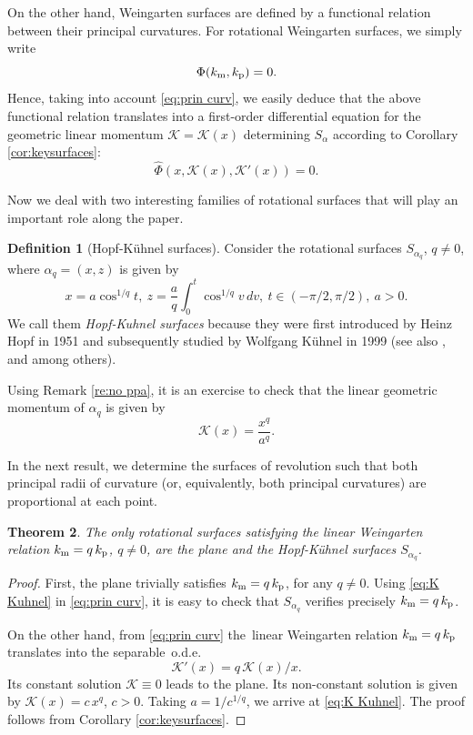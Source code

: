 \documentclass[leqno,11pt]{amsart}
\newtheorem{theorem}{Theorem}[section]
\theoremstyle{definition}
\newtheorem{definition}[theorem]{Definition}
\numberwithin{equation}{section}
\begin{document}
On the other hand, Weingarten surfaces are defined by a functional relation between their principal curvatures.
For rotational Weingarten surfaces,
we simply write $$\Phi(k_{\text m}, k_{\text p})=0.$$
Hence, taking into account \eqref{eq:prin curv}, we easily deduce that the above functional relation translates into a first-order differential equation for the geometric linear momentum $\mathcal K=\mathcal K (x)$ determining $S_\alpha$ according to Corollary \ref{cor:keysurfaces}: 
$$ \hat \Phi (x,\mathcal K  (x),\mathcal K ' (x))=0. $$

Now we deal with two interesting families of rotational surfaces that will play an important role along the paper.
\begin{definition}[Hopf-Kühnel surfaces]\label{def:Kuhnel}
	 Consider the rotational surfaces $S_{\alpha_q}$, $q\neq 0$, where $\alpha_q=(x,z)$ is given by
	 $$
	 x= a \cos ^{1/q} t, \ z= \frac{a}{q}\int_0^t \cos ^{1/q} v \, dv, \ t\in (-\pi/2,\pi/2), \ a>0. 
	 $$
	 We call them {\em Hopf-Kuhnel surfaces} because they were first introduced by Heinz Hopf  \cite{H51} in 1951 and subsequently studied by Wolfgang Kühnel \cite{K15} in 1999 (see also \cite{F93}, \cite{KS05} and \cite{LP20} among others).
\end{definition}
Using Remark \ref{re:no ppa}, it is an exercise to check that the linear geometric momentum of $\alpha_q$ is given by
\begin{equation}\label{eq:K Kuhnel}
	\mathcal K (x)= \frac{x^q}{a^q}.
\end{equation}

In the next result, we determine the surfaces of revolution such that both principal radii of curvature (or, equivalently, both principal curvatures) are proportional at each point.
	
	\begin{theorem}\label{Th:Kuhnel}
		The only rotational surfaces satisfying the linear Weingarten relation $k_{\text m} = q\,  k_{\text p}$, $q\neq 0$, are the plane and the Hopf-Kühnel surfaces $S_{\alpha_q}$.
	\end{theorem}
	
	\begin{proof}
		First, the plane trivially satisfies $k_{\text m} = q\,  k_{\text p}$, for any $q\neq 0$. Using \eqref{eq:K Kuhnel} in \eqref{eq:prin curv}, it is easy to check that $S_{\alpha_q}$ verifies precisely $k_{\text m} = q\,  k_{\text p}$.
		
		On the other hand, from \eqref{eq:prin curv} 
		the~linear Weingarten relation $k_{\text m}=q\,  k_{\text p}$ translates into the separable~o.d.e.
		$$\mathcal K ' (x)=q\, \mathcal K(x)/x. $$
		Its constant solution $\mathcal K \equiv 0$ leads to the plane.
		Its non-constant solution is given by $\mathcal K (x)= c \, x^q$, $c>0$. Taking $a=1/c^{1/q}$, we arrive at \eqref{eq:K Kuhnel}. The proof follows from Corollary \ref{cor:keysurfaces}.
	\end{proof}	
\end{document}

